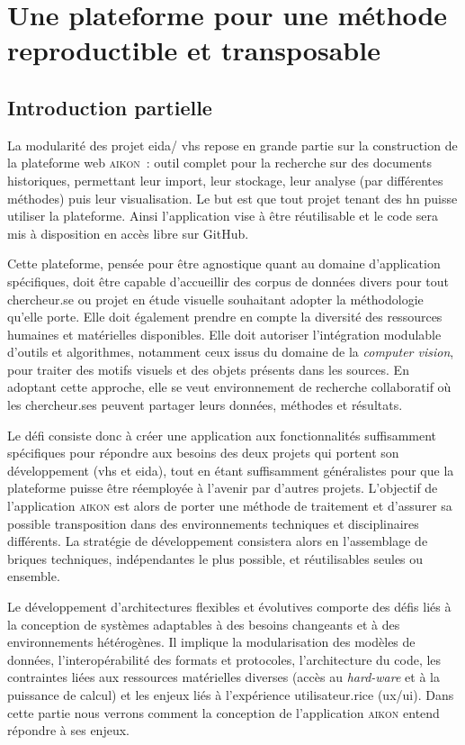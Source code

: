 \documentclass[a4paper,12pt,twoside]{book}
\newcommand{\eida}{\gls{eida}\xspace}
\newcommand{\aikon}{\textsc{aikon}\xspace}
\newcommand{\cv}{\emph{computer vision}\xspace}
\newcommand{\vhs}{\gls{vhs}\xspace}
\newcommand{\hn}{\gls{hn}\xspace}
\newcommand{\ux}{\gls{ux}\xspace}
\newcommand{\ui}{\gls{ui}\xspace}
\begin{document}
    \part{Une plateforme pour une méthode reproductible et transposable}

\chapter*{Introduction partielle}

La modularité des projet \eida / \vhs repose en grande partie sur la
construction de la plateforme web \aikon~: outil complet pour la
recherche sur des documents historiques, permettant leur import,
leur stockage, leur analyse (par différentes méthodes) puis leur visualisation. Le but
est que tout projet tenant des \hn puisse utiliser la plateforme. Ainsi
l'application vise à être réutilisable et le code sera mis à disposition
en accès libre sur GitHub.

Cette plateforme, pensée pour être agnostique quant au domaine
d'application spécifiques, doit être capable d'accueillir des corpus de
données divers pour tout chercheur.se ou projet en étude visuelle
souhaitant adopter la méthodologie qu'elle porte. Elle doit également
prendre en compte la diversité des ressources humaines et matérielles
disponibles. Elle doit autoriser l'intégration modulable d'outils et algorithmes, notamment
ceux issus du domaine de la \cv, pour traiter des motifs
visuels et des objets présents dans les sources. En adoptant cette
approche, elle se veut environnement de recherche collaboratif où les
chercheur.ses peuvent partager leurs données, méthodes et résultats.

Le défi consiste donc à créer une application aux fonctionnalités
suﬀisamment spécifiques pour répondre aux besoins des deux projets qui
portent son développement (\vhs et \eida), tout en étant suﬀisamment
généralistes pour que la plateforme puisse être réemployée à l'avenir
par d'autres projets. L'objectif de l'application \aikon est alors de porter une
méthode de traitement et d'assurer sa possible transposition dans des
environnements techniques et disciplinaires différents. La stratégie de
développement consistera alors en l'assemblage de briques techniques,
indépendantes le plus possible, et réutilisables seules ou ensemble.

Le développement d'architectures flexibles et évolutives comporte des
défis liés à la conception de systèmes adaptables à des
besoins changeants et à des environnements hétérogènes. Il implique la
modularisation des modèles de données, l'interopérabilité des formats et
protocoles, l'architecture du code, les contraintes liées aux
ressources matérielles diverses (accès au \textit{hard-ware} et à la puissance de
calcul) et les enjeux liés à l'expérience utilisateur.rice (\ux/\ui).
Dans cette partie nous verrons comment la conception de l'application
\aikon entend répondre à ses enjeux.
\end{document}
